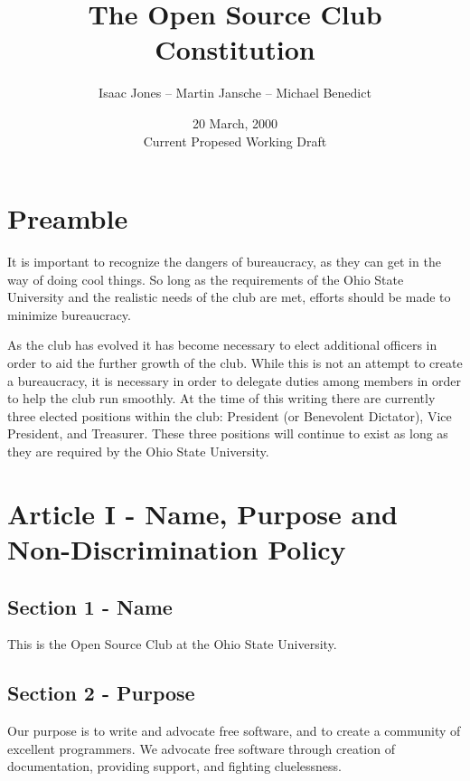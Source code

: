 \documentclass{article}
\title{The Open Source Club Constitution}
\author{Isaac Jones -- Martin Jansche -- Michael Benedict}
\date{20 March, 2000\\ Current Propesed Working Draft} %
\begin{document}
	\maketitle

	\section{Preamble}


	It is important to recognize the dangers of bureaucracy, as they can get in
	the way of doing cool things.  So long as the requirements of the Ohio
	State University and the realistic needs of the club are met, efforts
	should be made to minimize bureaucracy.

	As the club has evolved it has become necessary to elect additional
	officers in order to aid the further growth of the club. While this is not
	an attempt to create a bureaucracy, it is necessary in order to delegate
	duties among members in order to help the club run smoothly. At the time of
	this writing there are currently three elected positions within the club:
	President (or Benevolent Dictator), Vice President, and Treasurer. These
	three positions will continue to exist as long as they are required by the
	Ohio State University.

	\section{Article I - Name, Purpose and Non-Discrimination Policy}

	\subsection{Section 1 - Name}

	This is the Open Source Club at the Ohio State University.

	\subsection{Section 2 - Purpose}

	Our purpose is to write and advocate free software, and to create a
	community of excellent programmers. We advocate free software through
	creation of documentation, providing support, and fighting cluelessness.
\end{document}
